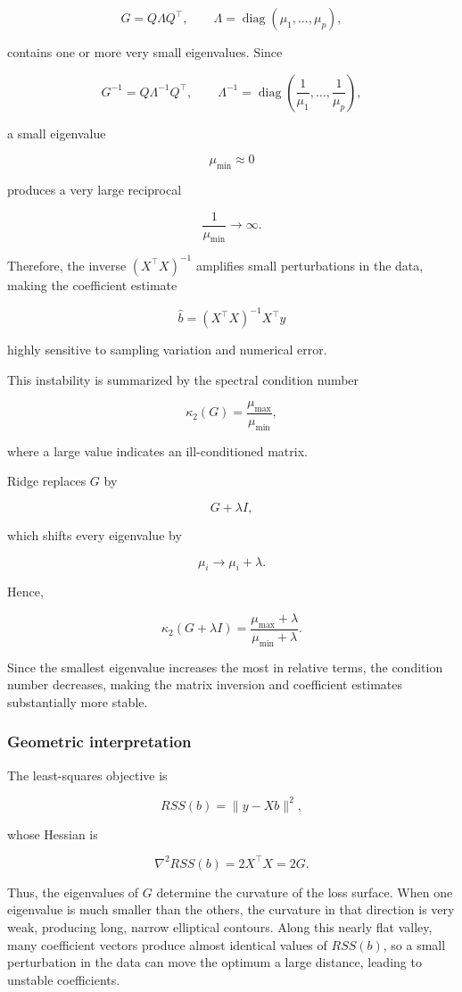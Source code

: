 \documentclass[
  11pt,
]{article}
\begin{document}
\[G=Q\Lambda Q^\top,
\qquad
\Lambda=\operatorname{diag}(\mu_1,\ldots,\mu_p),\]

contains one or more very small eigenvalues. Since

\[G^{-1}
=
Q\Lambda^{-1}Q^\top,
\qquad
\Lambda^{-1}
=
\operatorname{diag}
\left(
\frac1{\mu_1},
\ldots,
\frac1{\mu_p}
\right),\]

a small eigenvalue

\[\mu_{\min}\approx0\]

produces a very large reciprocal

\[\frac{1}{\mu_{\min}}
\rightarrow
\infty.\]

Therefore, the inverse \((X^\top X)^{-1}\) amplifies small perturbations
in the data, making the coefficient estimate

\[\hat b=(X^\top X)^{-1}X^\top y\]

highly sensitive to sampling variation and numerical error.

This instability is summarized by the spectral condition number

\[\kappa_2(G)
=
\frac{\mu_{\max}}
{\mu_{\min}},\]

where a large value indicates an ill-conditioned matrix.

Ridge replaces \(G\) by

\[G+\lambda I,\]

which shifts every eigenvalue by

\[\mu_i
\longrightarrow
\mu_i+\lambda.\]

Hence,

\[\kappa_2(G+\lambda I)
=
\frac{\mu_{\max}+\lambda}
{\mu_{\min}+\lambda}.\]

Since the smallest eigenvalue increases the most in relative terms, the
condition number decreases, making the matrix inversion and coefficient
estimates substantially more stable.

\subsubsection{Geometric interpretation}\label{geometric-interpretation}

The least-squares objective is

\[RSS(b)=\|y-Xb\|^2,\]

whose Hessian is

\[\nabla^2RSS(b)=2X^\top X=2G.\]

Thus, the eigenvalues of \(G\) determine the curvature of the loss
surface. When one eigenvalue is much smaller than the others, the
curvature in that direction is very weak, producing long, narrow
elliptical contours. Along this nearly flat valley, many coefficient
vectors produce almost identical values of \(RSS(b)\), so a small
perturbation in the data can move the optimum a large distance, leading
to unstable coefficients.
\end{document}
